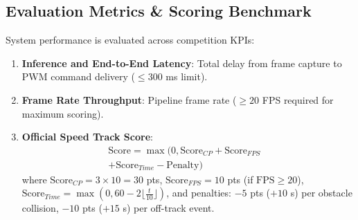 \documentclass[conference]{IEEEtran}
\begin{document}
\subsection{Evaluation Metrics \& Scoring Benchmark}
System performance is evaluated across competition KPIs:
\begin{enumerate}
    \item \textbf{Inference and End-to-End Latency}: Total delay from frame capture to PWM command delivery ($\le 300$ ms limit).
    \item \textbf{Frame Rate Throughput}: Pipeline frame rate ($\ge 20$ FPS required for maximum scoring).
    \item \textbf{Official Speed Track Score}:
          \begin{equation}
              \begin{split}
                  \text{Score} = \max(0, \text{Score}_{CP} + \text{Score}_{FPS} & \\
                  + \text{Score}_{Time} - \text{Penalty}) &
              \end{split}
          \end{equation}
          where $\text{Score}_{CP} = 3 \times 10 = 30$ pts, $\text{Score}_{FPS} = 10$ pts (if $\text{FPS} \ge 20$), $\text{Score}_{Time} = \max(0, 60 - 2 \lfloor \frac{t}{10} \rfloor)$, and penalties: $-5$ pts ($+10$ s) per obstacle collision, $-10$ pts ($+15$ s) per off-track event.
\end{enumerate}
\end{document}

